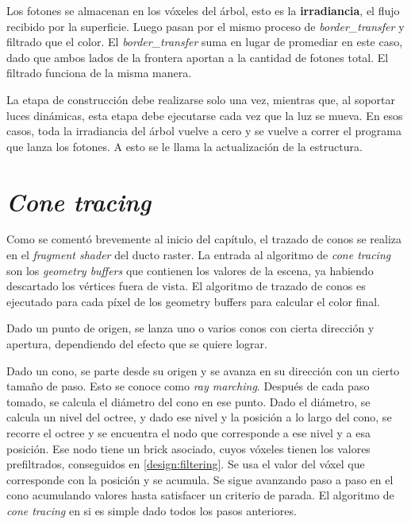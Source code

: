 Los fotones se almacenan en los vóxeles del árbol, esto es la \textbf{irradiancia}, el flujo recibido por la superficie.
Luego pasan por el mismo proceso de \textit{border\_transfer} y filtrado que el color.
El \textit{border\_transfer} suma en lugar de promediar en este caso, dado que ambos lados de la frontera aportan a la cantidad de fotones total.
El filtrado funciona de la misma manera.

La etapa de construcción debe realizarse solo una vez, mientras que, al soportar luces dinámicas, esta etapa debe ejecutarse cada vez que la luz se mueva.
En esos casos, toda la irradiancia del árbol vuelve a cero y se vuelve a correr el programa que lanza los fotones.
A esto se le llama la actualización de la estructura.


\section{\textit{Cone tracing}}\label{sec:cone_tracing}

Como se comentó brevemente al inicio del capítulo, el trazado de conos se realiza en el \textit{fragment shader} del ducto raster.
La entrada al algoritmo de \textit{cone tracing} son los \textit{geometry buffers} que contienen los valores de la escena, ya habiendo descartado los vértices fuera de vista.
El algoritmo de trazado de conos es ejecutado para cada píxel de los geometry buffers para calcular el color final.

Dado un punto de origen, se lanza uno o varios conos con cierta dirección y apertura, dependiendo del efecto que se quiere lograr.

Dado un cono, se parte desde su origen y se avanza en su dirección con un cierto tamaño de paso.
Esto se conoce como \textit{ray marching}. %
Después de cada paso tomado, se calcula el diámetro del cono en ese punto.
Dado el diámetro, se calcula un nivel del octree, y dado ese nivel y la posición a lo largo del cono, se recorre el octree y se encuentra el nodo que corresponde a ese nivel y a esa posición.
Ese nodo tiene un brick asociado, cuyos vóxeles tienen los valores prefiltrados, conseguidos en \ref{design:filtering}.
Se usa el valor del vóxel que corresponde con la posición y se acumula.
Se sigue avanzando paso a paso en el cono acumulando valores hasta satisfacer un criterio de parada.
El algoritmo de \textit{cone tracing} en si es simple dado todos los pasos anteriores.

